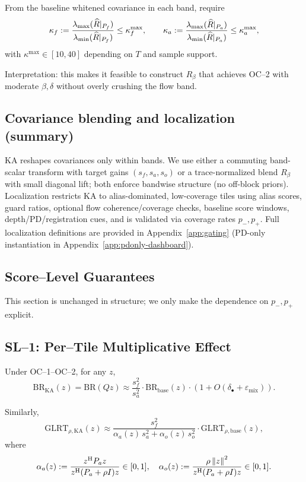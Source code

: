 From the baseline whitened covariance in each band, require
\[
\kappa_f := \frac{\lambda_{\max}(\widehat R|_{P_f})}{\lambda_{\min}(\widehat R|_{P_f})} \le \kappa_f^{\max},\qquad
\kappa_a := \frac{\lambda_{\max}(\widehat R|_{P_a})}{\lambda_{\min}(\widehat R|_{P_a})} \le \kappa_a^{\max},
\]
with $\kappa^{\max}\in[10,40]$ depending on $T$ and sample support.

Interpretation: this makes it feasible to construct $R_\beta$ that achieves OC--2 with moderate $\beta,\delta$ without overly crushing the flow band.

\subsection{Covariance blending and localization (summary)}
\label{sec:cov-blending}

KA reshapes covariances only within bands. We use either a commuting band-scalar transform with target gains $(s_f,s_a,s_o)$ or a trace-normalized blend $R_\beta$ with small diagonal lift; both enforce bandwise structure (no off-block priors). Localization restricts KA to alias-dominated, low-coverage tiles using alias scores, guard ratios, optional flow coherence/coverage checks, baseline score windows, depth/PD/registration cues, and is validated via coverage rates $p_-,p_+$. Full localization definitions are provided in Appendix~\ref{app:gating} (PD-only instantiation in Appendix~\ref{app:pdonly-dashboard}).

\subsection{Score--Level Guarantees}
\label{sec:score-level}

This section is unchanged in structure; we only make the dependence on $p_-,p_+$ explicit.

\subsection{SL--1: Per--Tile Multiplicative Effect}

Under OC--1--OC--2, for any $z$,
\[
\mathrm{BR}_{\text{KA}}(z) = \mathrm{BR}(Qz) 
  \approx \frac{s_f^2}{s_a^2} \cdot \mathrm{BR}_{\text{base}}(z) \cdot (1 + O(\delta_\bullet+\varepsilon_{\text{mix}})).
\]

Similarly,
\[
\mathrm{GLRT}_{\rho,\text{KA}}(z) \approx 
  \frac{s_f^2}{\alpha_a(z)\,s_a^2 + \alpha_o(z)\,s_o^2}\cdot \mathrm{GLRT}_{\rho,\text{base}}(z),
\]
where
\[
\alpha_a(z) := \frac{z^{\mathrm{H}} P_a z}{z^{\mathrm{H}}(P_a+\rho I)z} \in [0,1],\quad
\alpha_o(z) := \frac{\rho\left\lVert z \right\rVert^2}{z^{\mathrm{H}}(P_a+\rho I)z}\in[0,1].
\]

